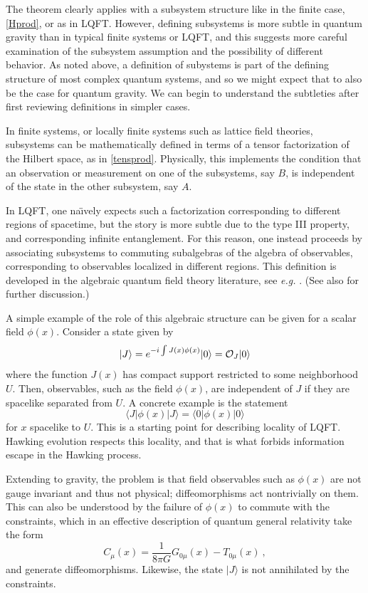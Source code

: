 \documentclass[11pt]{article}
\numberwithin{equation}{section}
\newcommand{\beq}{\begin{equation}}
\newcommand{\eeq}{\end{equation}}
\begin{document}
The theorem clearly applies with a subsystem structure like in the finite case, \eqref{Hprod}, or as in LQFT.  However, 
defining subsystems is more subtle in quantum gravity than in typical finite systems or LQFT, and this suggests more careful examination of the subsystem assumption and the possibility of different behavior.  
As noted above, a definition of subystems is part of the defining structure of most complex quantum systems, and so we might expect that to also be the case for quantum gravity.  We can begin to understand the subtleties after first reviewing definitions in simpler cases.

In finite systems, or locally finite systems such as lattice field theories, subsystems can be mathematically defined in terms of a tensor factorization of the Hilbert space, as in \eqref{tensprod}.  Physically, this implements the condition that  an observation or measurement on one of the subsystems, say $B$, is independent of the state in the other subsystem, say $A$.  

In LQFT, one na\"\i vely expects such a factorization corresponding to different regions of spacetime, but the story is more subtle due to the type III property, and corresponding infinite entanglement.  For this reason, one instead proceeds by associating subsystems to commuting subalgebras of the algebra of observables, corresponding to observables localized in different regions.  This definition is developed in the algebraic quantum field theory literature, see {\it e.g.} \cite{Haag}.  (See also \cite{SGalg} for further discussion.)

A simple example of the role of this algebraic structure  can be given for a scalar field $\phi(x)$.  Consider a state given by
\beq\label{JstateD}
|J\rangle= e^{-i\int J(x)\phi(x)} |0\rangle = {\cal O}_J|0\rangle
\eeq
where the function $J(x)$ has compact support restricted to some neighborhood $U$.  Then, observables, such as the field $\phi(x)$, are independent of $J$ if they are spacelike separated from $U$.  A concrete example is the statement
\beq\label{Jstate}
\langle J|\phi(x)|J\rangle=\langle0|\phi(x)|0\rangle
\eeq
for $x$ spacelike to $U$.  This is a starting point for describing locality of LQFT. Hawking evolution respects this locality, and that is what forbids information escape in the Hawking process.

Extending to gravity, the problem is that field observables such as $\phi(x)$ are not gauge invariant and thus not physical; diffeomorphisms act nontrivially on them.  This can also be understood by the failure of $\phi(x)$ to commute with the constraints, which in an effective description of quantum general relativity take the form
\beq
C_\mu(x)=\frac{1}{8\pi G} G_{0\mu}(x)-T_{0\mu}(x)\ ,
\eeq
and generate  diffeomorphisms.
Likewise, the state $|J\rangle$ is not annihilated by the constraints.  
\end{document}
